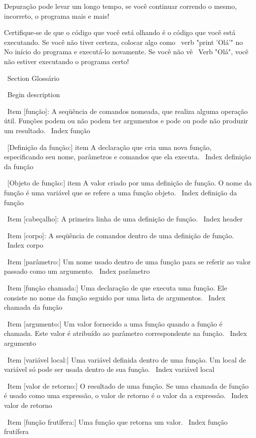 \documentclass[10pt]{book}
\begin{document}
\begin {itemize}
{Depuração pode levar um longo tempo, se você continuar correndo o mesmo,
incorreto, o programa mais e mais!

Certifique-se de que o código que você está olhando é o código que você está executando.
Se você não tiver certeza, colocar algo como \ verb "print 'Olá'" no
No início do programa e executá-lo novamente. Se você não vê
\ Verb "Olá", você não estiver executando o programa certo!




\ Section {} Glossário

\ Begin {description}

\ Item [função]: A seqüência de comandos nomeada, que realiza alguma
operação útil. Funções podem ou não podem ter argumentos e pode ou
pode não produzir um resultado.
\ Index {função}

\ [Definição da função:] item A declaração que cria uma nova função,
especificando seu nome, parâmetros e comandos que ela executa.
\ Index {definição da função}

\ [Objeto de função:] item A valor criado por uma definição de função.
O nome da função é uma variável que se refere a uma função
objeto.
\ Index {definição da função}

\ Item [cabeçalho]: A primeira linha de uma definição de função.
\ Index {header}

\ Item [corpo]: A seqüência de comandos dentro de uma definição de função.
\ Index {corpo}

\ Item [parâmetro:] Um nome usado dentro de uma função para se referir ao valor
passado como um argumento.
\ Index {parâmetro}

\ Item [função chamada:] Uma declaração de que executa uma função. Ele
consiste no nome da função seguido por uma lista de argumentos.
\ Index {chamada da função}

\ Item [argumento:] Um valor fornecido a uma função quando a função é chamada.
Este valor é atribuído ao parâmetro correspondente na função.
\ Index {argumento}

\ Item [variável local:] Uma variável definida dentro de uma função. Um local de
variável só pode ser usada dentro de sua função.
\ Index {variável local}

\ Item [valor de retorno:] O resultado de uma função. Se uma chamada de função
é usado como uma expressão, o valor de retorno é o valor da
a expressão.
\ Index {valor de retorno}

\ Item [função frutífera:] Uma função que retorna um valor.
\ Index {função frutífera}

}
\end{itemize}
\end{document}
